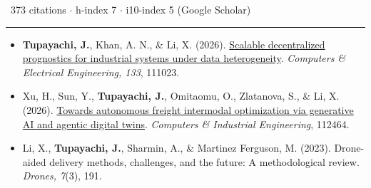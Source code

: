 \documentclass[10pt,a4paper]{extarticle}
\newif\ifteaching
\newcommand{\link}[2]{\href{#1}{#2}}
\newcommand{\sect}[2][]{\needspace{45pt}\vspace{9pt}%
  {\color{navy}\bfseries\large\textls[60]{\MakeUppercase{#2}}}{\color{muted}\small\ #1}\\[-6.5pt]
  {\color{navy}\rule{\linewidth}{0.5pt}}\par\vspace{-1pt}}
\newcommand{\m}[1]{\textbf{#1}}
\begin{document}
\sect[373 citations $\cdot$ h-index 7 $\cdot$ i10-index 5 (Google Scholar)]{\ifteaching Publications\else Selected Publications\fi}
\begin{itemize}[itemsep=1.2pt]
\item \m{Tupayachi, J.}, Khan, A. N., \& Li, X. (2026). \link{https://doi.org/10.1016/j.compeleceng.2026.111023}{Scalable decentralized prognostics for industrial systems under data heterogeneity}. \textit{Computers \& Electrical Engineering, 133}, 111023.
\ifteaching
\item Khan, A. N., \m{Tupayachi, J.}, Dabbs, W., Chamberlin, S., Yao, B., \& Li, X. (2026). \link{https://doi.org/10.1038/s41746-026-03100-8}{CliniSense AI for automated clinical skills assessment with real-time feedback}. \textit{npj Digital Medicine}.
\fi
\ifteaching
\item Wyatt, T. H., Lowe, S., \m{Tupayachi, J.}, \& Li, X. (2026). \link{https://doi.org/10.1177/14604582261419334}{Design and usability testing of SmartSHOTS: A mobile app to reduce vaccine barriers for children 0--24 months}. \textit{Health Informatics Journal, 32}(1).
\fi
\item Xu, H., Sun, Y., \m{Tupayachi, J.}, Omitaomu, O., Zlatanova, S., \& Li, X. (2026). \link{https://doi.org/10.1016/j.cie.2026.112464}{Towards autonomous freight intermodal optimization via generative AI and agentic digital twins}. \textit{Computers \& Industrial Engineering}, 112464.
\ifteaching
\item Xu, H., Li, X., \m{Tupayachi, J.}, Lian, J. J., \& Omitaomu, O. A. (2024). \link{https://doi.org/10.1145/3681780.3697252}{Automating bibliometric analysis with sentence transformers and RAG}. \textit{ACM SIGSPATIAL Urban-AI Workshop}, 1--10.
\fi
\ifteaching
\item \m{Tupayachi, J.}, Ferguson, M. M., \& Li, X. (2024). \link{https://doi.org/10.23919/annsim61499.2024.10732085}{A simulation-based real-time deep reinforcement learning approach for fighting wildfires}. \textit{ANNSIM 2024}, 1--12.
\fi
\ifteaching
\item \m{Tupayachi, J.}, Xu, H., Omitaomu, O. A., Camur, M. C., Sharmin, A., \& Li, X. (2024). \link{https://doi.org/10.3390/smartcities7050094}{Towards next-generation urban decision support systems through AI-powered construction of scientific ontology using large language models}. \textit{Smart Cities, 7}(5), 2392--2421.
\fi
\ifteaching
\item Li, X., \m{Tupayachi, J.}, Sharmin, A., \& Martinez Ferguson, M. (2023). Drone-aided delivery methods, challenges, and the future: A methodological review. \textit{Drones, 7}(3), 191.

\end{itemize}
\end{document}
